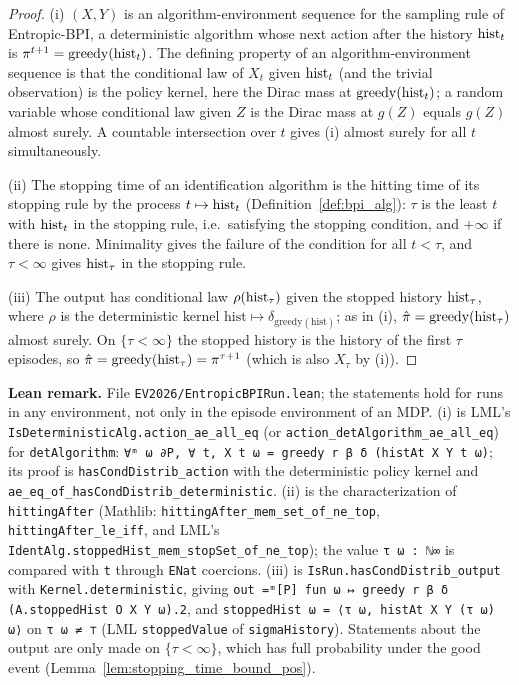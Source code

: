 \begin{proof}
\leanok
(i) $(X, Y)$ is an algorithm-environment sequence for the sampling rule of Entropic-BPI, a
deterministic algorithm whose next action after the history $\mathrm{hist}_t$ is $\pi^{t+1} = \mathrm{greedy}(\mathrm{hist}_t)$.
The defining property of an algorithm-environment sequence is that the conditional law of
$X_t$ given $\mathrm{hist}_t$ (and the trivial observation) is the policy kernel, here the Dirac mass
at $\mathrm{greedy}(\mathrm{hist}_t)$; a random variable whose conditional law given $Z$ is the Dirac mass
at $g(Z)$ equals $g(Z)$ almost surely. A countable intersection over $t$ gives (i) almost
surely for all $t$ simultaneously.

(ii) The stopping time of an identification algorithm is the hitting time of its stopping rule
by the process $t \mapsto \mathrm{hist}_t$ (Definition~\ref{def:bpi_alg}): $\tau$ is the least $t$ with
$\mathrm{hist}_t$ in the stopping rule, i.e.\ satisfying the stopping condition, and $+\infty$ if there is
none. Minimality gives the failure of the condition for all $t < \tau$, and $\tau < \infty$ gives
$\mathrm{hist}_\tau$ in the stopping rule.

(iii) The output has conditional law $\rho(\mathrm{hist}_\tau)$ given the stopped history $\mathrm{hist}_\tau$,
where $\rho$ is the deterministic kernel $\mathrm{hist} \mapsto \delta_{\mathrm{greedy}(\mathrm{hist})}$; as in (i),
$\hat\pi = \mathrm{greedy}(\mathrm{hist}_\tau)$ almost surely. On $\{\tau < \infty\}$ the stopped history is the
history of the first $\tau$ episodes, so $\hat\pi = \mathrm{greedy}(\mathrm{hist}_\tau) = \pi^{\tau + 1}$
(which is also $X_\tau$ by (i)).
\end{proof}

\textbf{Lean remark.} File \texttt{EV2026/EntropicBPIRun.lean}; the statements hold for runs in
any environment, not only in the episode environment of an MDP. (i) is LML's
\texttt{IsDeterministicAlg.action\_ae\_all\_eq} (or
\texttt{action\_detAlgorithm\_ae\_all\_eq}) for \texttt{detAlgorithm}: \texttt{∀ᵐ ω ∂P, ∀ t, X t ω = greedy r β δ (histAt X Y t ω)};
its proof is \texttt{hasCondDistrib\_action} with the deterministic policy kernel and
\texttt{ae\_eq\_of\_hasCondDistrib\_deterministic}. (ii) is the characterization of
\texttt{hittingAfter} (Mathlib: \texttt{hittingAfter\_mem\_set\_of\_ne\_top},
\texttt{hittingAfter\_le\_iff}, and LML's \texttt{IdentAlg.stoppedHist\_mem\_stopSet\_of\_ne\_top});
the value \texttt{τ ω : ℕ∞} is compared with \texttt{t} through \texttt{ENat} coercions. (iii)
is \texttt{IsRun.hasCondDistrib\_output} with \texttt{Kernel.deterministic}, giving
\texttt{out =ᵐ[P] fun ω ↦ greedy r β δ (A.stoppedHist O X Y ω).2}, and
\texttt{stoppedHist ω = ⟨τ ω, histAt X Y (τ ω) ω⟩} on \texttt{τ ω ≠ ⊤} (LML
\texttt{stoppedValue} of \texttt{sigmaHistory}). Statements about the output are only made on
$\{\tau < \infty\}$, which has full probability under the good event
(Lemma~\ref{lem:stopping_time_bound_pos}).

